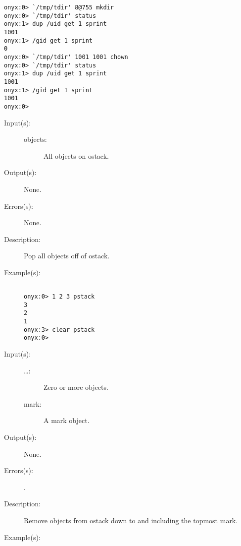 \begin{description}
\begin{description}
\begin{verbatim}
onyx:0> `/tmp/tdir' 8@755 mkdir
onyx:0> `/tmp/tdir' status 
onyx:1> dup /uid get 1 sprint
1001
onyx:1> /gid get 1 sprint
0
onyx:0> `/tmp/tdir' 1001 1001 chown
onyx:0> `/tmp/tdir' status
onyx:1> dup /uid get 1 sprint
1001
onyx:1> /gid get 1 sprint
1001
onyx:0>
		\end{verbatim}
	\end{description}
\label{systemdict:clear}
\item[{\onyxop{objects}{clear}{--}}: ]
	\begin{description}\item[]
	\item[Input(s): ]
		\begin{description}\item[]
		\item[objects: ]
			All objects on ostack.
		\end{description}
	\item[Output(s): ] None.
	\item[Errors(s): ] None.
	\item[Description: ]
		Pop all objects off of ostack.
	\item[Example(s): ]\begin{verbatim}

onyx:0> 1 2 3 pstack
3
2
1
onyx:3> clear pstack
onyx:0>
		\end{verbatim}
	\end{description}
\label{systemdict:cleartomark}
\item[{\onyxop{mark \dots}{cleartomark}{--}}: ]
	\begin{description}\item[]
	\item[Input(s): ]
		\begin{description}\item[]
		\item[\dots: ]
			Zero or more objects.
		\item[mark: ]
			A mark object.
		\end{description}
	\item[Output(s): ] None.
	\item[Errors(s): ]
		\begin{description}\item[]
		\item[.]
		\end{description}
	\item[Description: ]
		Remove objects from ostack down to and including the topmost
		mark.
	\item[Example(s): ]\begin{verbatim}


\end{verbatim}
\end{description}
\end{description}
